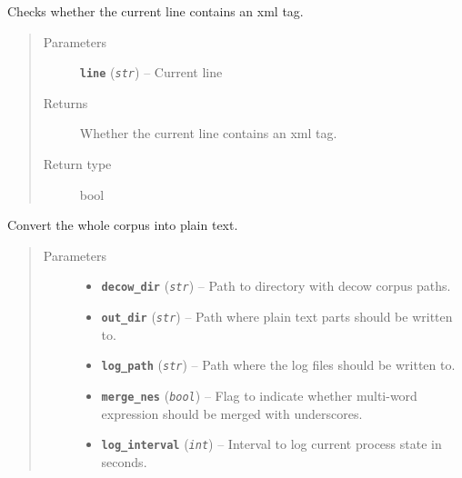 \documentclass[letterpaper,10pt,english]{sphinxmanual}
\begin{document}
\begin{fulllineitems}
\label{src.prep.corpus:src.prep.corpus.convert_to_plain.contains_tag}
Checks whether the current line contains an xml tag.
\begin{quote}\begin{description}
\item[{Parameters}] \leavevmode
\textbf{\texttt{line}} (\emph{\texttt{str}}) -- Current line

\item[{Returns}] \leavevmode
Whether the current line contains an xml tag.

\item[{Return type}] \leavevmode
bool

\end{description}\end{quote}

\end{fulllineitems}


\begin{fulllineitems}
\label{src.prep.corpus:src.prep.corpus.convert_to_plain.convert_decow_to_plain}
Convert the whole corpus into plain text.
\begin{quote}\begin{description}
\item[{Parameters}] \leavevmode\begin{itemize}
\item {} 
\textbf{\texttt{decow\_dir}} (\emph{\texttt{str}}) -- Path to directory with decow corpus paths.

\item {} 
\textbf{\texttt{out\_dir}} (\emph{\texttt{str}}) -- Path where plain text parts should be written to.

\item {} 
\textbf{\texttt{log\_path}} (\emph{\texttt{str}}) -- Path where the log files should be written to.

\item {} 
\textbf{\texttt{merge\_nes}} (\emph{\texttt{bool}}) -- Flag to indicate whether multi-word expression should be merged with underscores.

\item {} 
\textbf{\texttt{log\_interval}} (\emph{\texttt{int}}) -- Interval to log current process state in seconds.

\end{itemize}

\end{description}\end{quote}

\end{fulllineitems}
\end{document}
